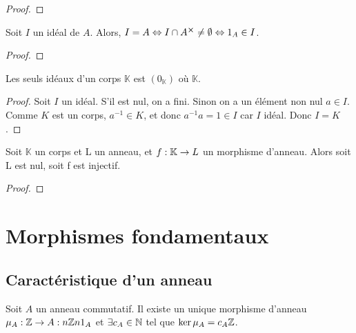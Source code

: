 \ifdefined\outputproof
\begin{proof}

\end{proof}
\fi

\begin{proposition}
	Soit $I$ un idéal de $A$. Alors, $I = A \Leftrightarrow I \cap A^{\cross} \neq
	\emptyset \Leftrightarrow 1_{A} \in I$.
\end{proposition}

\ifdefined\outputproof
\begin{proof}

\end{proof}
\fi

\begin{proposition}
	Les seuls idéaux d'un corps $\mathbb{K}$ est $(0_{\mathbb{K}})$ où
	$\mathbb{K}$.
\end{proposition}

\ifdefined\outputproof
\begin{proof}
	Soit $I$ un idéal. S'il est nul, on a fini. Sinon on a un élément non
	nul $a \in I$. Comme $K$ est un corps, $a^{-1} \in K$, et donc $a^{-1}a = 1
	\in I$ car $I$ idéal. Donc $I = K$.
\end{proof}
\fi

\begin{corollary}
	Soit $\mathbb{K}$ un corps et L un anneau, et
	$f : \mathbb{K} \rightarrow L$ un morphisme d'anneau. Alors soit L est nul,
	soit f est injectif.
\end{corollary}

\ifdefined\outputproof
\begin{proof}

\end{proof}
\fi


\section{Morphismes fondamentaux}

\subsection{Caractéristique d'un anneau}

\begin{proposition}
	Soit $A$ un anneau commutatif. Il existe un unique morphisme d'anneau
	$\mu_{A} : \mathbb{Z} \rightarrow A : n \mathbb{Z} n 1_{A}$ et $\exists c_{A} \in
	\mathbb{N}$ tel que $\ker{\mu_{A}} = c_{A} \mathbb{Z}$.
\end{proposition}


